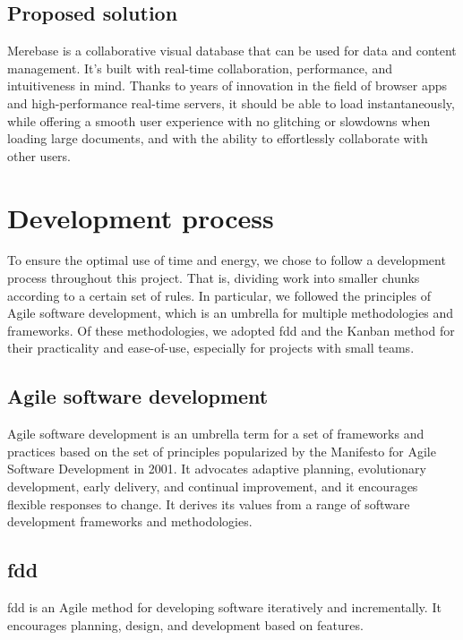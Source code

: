 \subsection{Proposed solution}

Merebase is a collaborative visual database that can be used for data
and content management. It's built with real-time collaboration,
performance, and intuitiveness in mind. Thanks to years of innovation in
the field of browser apps and high-performance real-time servers, it
should be able to load instantaneously, while offering a smooth user
experience with no glitching or slowdowns when loading large documents,
and with the ability to effortlessly collaborate with other users.

\section{Development process}

To ensure the optimal use of time and energy, we chose to follow a development process throughout this project.
That is, dividing work into smaller chunks according to a certain set of rules. In particular, we followed the principles of Agile software development, which is an umbrella for multiple methodologies and frameworks.
Of these methodologies, we adopted \acrfull{fdd} and the Kanban method for their practicality and ease-of-use, especially for projects with small teams.

\subsection{Agile software development}

Agile software development is an umbrella term for a set of frameworks and practices based on the set of principles popularized by the Manifesto for Agile Software Development in 2001.
It advocates adaptive planning, evolutionary development, early delivery, and continual improvement, and it encourages flexible responses to change.
It derives its values from a range of software development frameworks and methodologies.

\subsection{\acrlong{fdd}}

\acrfull{fdd} is an Agile method for developing software iteratively and incrementally. It encourages planning, design, and development based on features.

